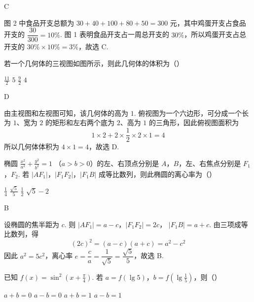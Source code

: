 \begin{answer}
C
\end{answer}

\begin{solution}
图 2 中食品开支总额为
\(30+40+100+80+50=300\) 元，其中鸡蛋开支占食品开支的
\(\dfrac{30}{300}=10\%\). 图 1 表明食品开支占一周总开支的 \(30\%\)，所以鸡蛋开支占总开支的
\(30\%\times10\%=3\%\)，故选 C.
\end{solution}

\begin{problem}
若一个几何体的三视图如图所示，则此几何体的体积为（\quad）


\choices
    {\(\frac{11}{2}\)}
    {\(5\)}
    {\(\frac{9}{2}\)}
    {\(4\)}
\end{problem}

\begin{answer}
D
\end{answer}

\begin{solution}
由主视图和左视图可知，该几何体的高为 \(1\). 俯视图为一个六边形，可分成一个长为 \(1\)、宽为 \(2\) 的矩形和左右两个底为 \(2\)、高为 \(1\) 的三角形，因此俯视图面积为
\[
1\times2+2\times\frac{1}{2}\times2\times1=4
\]
所以几何体体积为 \(4\times1=4\)，故选 D.
\end{solution}

\begin{problem}
椭圆 \(\frac{x^2}{a^2} + \frac{y^2}{b^2} = 1\) （\(a > b > 0\)）的左、右顶点分别是 \(A\)，\(B\)，左、右焦点分别是 \(F_1\)，\(F_2\). 若 \(|AF_1|\)，\(|F_1F_2|\)，\(|F_1B|\) 成等比数列，则此椭圆的离心率为（\quad）

\choices
    {\(\frac{1}{4}\)}
    {\(\frac{\sqrt{5}}{5}\)}
    {\(\frac{1}{2}\)}
    {\(\sqrt{5} - 2\)}
\end{problem}

\begin{answer}
B
\end{answer}

\begin{solution}
设椭圆的焦半距为 \(c\). 则
\(\lvert AF_1\rvert=a-c\)，\(\lvert F_1F_2\rvert=2c\)，
\(\lvert F_1B\rvert=a+c\). 由三项成等比数列，得
\[
(2c)^2=(a-c)(a+c)=a^2-c^2
\]
因此 \(a^2=5c^2\)，离心率
\(e=\dfrac{c}{a}=\dfrac{1}{\sqrt5}=\dfrac{\sqrt5}{5}\)，故选 B.
\end{solution}

\begin{problem}
已知 \( f(x) = \sin^2\left(x + \frac{\pi}{4}\right) \). 若 \(a = f(\lg 5)\)，\(b = f\left(\lg \frac{1}{5}\right)\)，则（\quad）

\choices
    {\( a + b = 0 \)}
    {\( a - b = 0 \)}
    {\( a + b = 1 \)}
    {\( a - b = 1 \)}
\end{problem}

